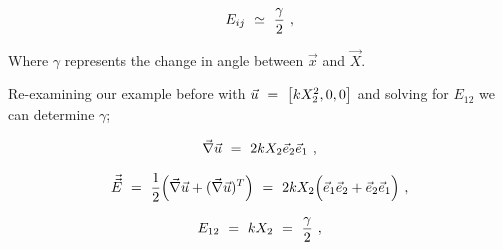 \documentclass{article}
\begin{document}
\begin{equation} \label{eq:1}
E_{i j} \hspace{0.125cm} \simeq \hspace{0.125cm} \frac{\gamma}{2} \hspace{0.125cm} ,
\end{equation} 

Where \begin{math} \gamma \end{math} represents the change in angle between \begin{math} \vec{x} \end{math} and \begin{math} \vec{X} \end{math}.

Re-examining our example before with \begin{math} \vec{u} \hspace{0.125cm} = \hspace{0.125cm} \big[ k X_{2}^{2} , 0 , 0 \big] \end{math} and solving for   \begin{math} E_{1 2} \end{math} we can determine \begin{math} \gamma \end{math};

\begin{equation} \label{eq:1}
\vec{\nabla} \vec{u} \hspace{0.125cm} = \hspace{0.125cm} 2 k X_2 \vec{e}_2 \vec{e}_1 \hspace{0.125cm} ,
\end{equation} 

\begin{equation} \label{eq:1}
\vec{\vec{E}} \hspace{0.125cm} = \hspace{0.125cm} \frac{1}{2} \Big( \vec{\nabla} \vec{u} + ( \vec{\nabla} \vec{u} )^T \Big) \hspace{0.125cm} = \hspace{0.125cm} 2 k X_2 \Big( \vec{e}_1 \vec{e}_2 + \vec{e}_2 \vec{e}_1 \Big) \hspace{0.125cm} ,
\end{equation} 

\begin{equation} \label{eq:1}
E_{1 2} \hspace{0.125cm} = \hspace{0.125cm} k X_2 \hspace{0.125cm} = \hspace{0.125cm} \frac{\gamma}{2} \hspace{0.125cm}  ,
\end{equation} 
\end{document}
